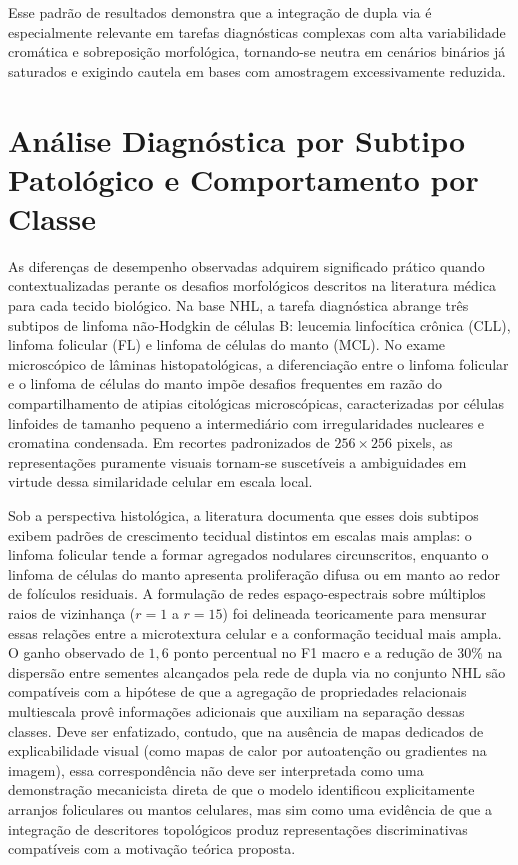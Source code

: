 Esse padrão de resultados demonstra que a integração de dupla via é especialmente relevante em tarefas diagnósticas complexas com alta variabilidade cromática e sobreposição morfológica, tornando-se neutra em cenários binários já saturados e exigindo cautela em bases com amostragem excessivamente reduzida.

\section{Análise Diagnóstica por Subtipo Patológico e Comportamento por Classe}
\label{sec:res-classes}

As diferenças de desempenho observadas adquirem significado prático quando contextualizadas perante os desafios morfológicos descritos na literatura médica para cada tecido biológico. Na base NHL, a tarefa diagnóstica abrange três subtipos de linfoma não-Hodgkin de células B: leucemia linfocítica crônica (CLL), linfoma folicular (FL) e linfoma de células do manto (MCL). No exame microscópico de lâminas histopatológicas, a diferenciação entre o linfoma folicular e o linfoma de células do manto impõe desafios frequentes em razão do compartilhamento de atipias citológicas microscópicas, caracterizadas por células linfoides de tamanho pequeno a intermediário com irregularidades nucleares e cromatina condensada. Em recortes padronizados de $256 \times 256$ pixels, as representações puramente visuais tornam-se suscetíveis a ambiguidades em virtude dessa similaridade celular em escala local.

Sob a perspectiva histológica, a literatura documenta que esses dois subtipos exibem padrões de crescimento tecidual distintos em escalas mais amplas: o linfoma folicular tende a formar agregados nodulares circunscritos, enquanto o linfoma de células do manto apresenta proliferação difusa ou em manto ao redor de folículos residuais. A formulação de redes espaço-espectrais sobre múltiplos raios de vizinhança ($r=1$ a $r=15$) foi delineada teoricamente para mensurar essas relações entre a microtextura celular e a conformação tecidual mais ampla. O ganho observado de $1{,}6$ ponto percentual no F1 macro e a redução de 30\% na dispersão entre sementes alcançados pela rede de dupla via no conjunto NHL são compatíveis com a hipótese de que a agregação de propriedades relacionais multiescala provê informações adicionais que auxiliam na separação dessas classes. Deve ser enfatizado, contudo, que na ausência de mapas dedicados de explicabilidade visual (como mapas de calor por autoatenção ou gradientes na imagem), essa correspondência não deve ser interpretada como uma demonstração mecanicista direta de que o modelo identificou explicitamente arranjos foliculares ou mantos celulares, mas sim como uma evidência de que a integração de descritores topológicos produz representações discriminativas compatíveis com a motivação teórica proposta.

